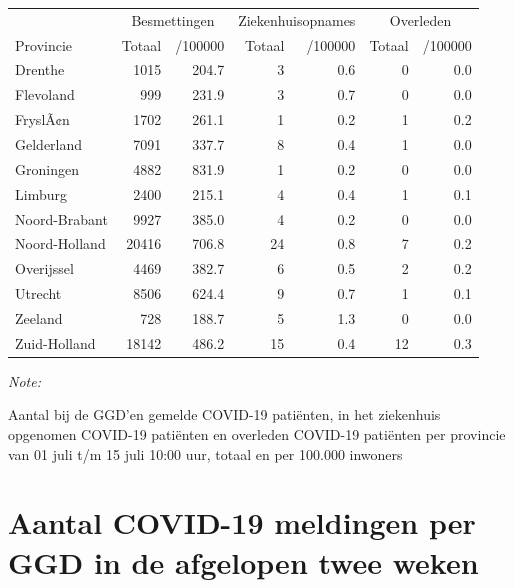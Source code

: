 \documentclass[
  english,
  man,floatsintext]{apa6}
\begin{document}
\begin{table}
\centering
\begin{threeparttable}
\begin{tabular}{lrrrrrr}
\toprule
\multicolumn{1}{c}{ } & \multicolumn{2}{c}{Besmettingen} & \multicolumn{2}{c}{Ziekenhuisopnames} & \multicolumn{2}{c}{Overleden} \\
\cmidrule(l{3pt}r{3pt}){2-3} \cmidrule(l{3pt}r{3pt}){4-5} \cmidrule(l{3pt}r{3pt}){6-7}
Provincie & Totaal & /100000 & Totaal & /100000 & Totaal & /100000\\
\midrule
Drenthe & 1015 & 204.7 & 3 & 0.6 & 0 & 0.0\\
Flevoland & 999 & 231.9 & 3 & 0.7 & 0 & 0.0\\
FryslÃ¢n & 1702 & 261.1 & 1 & 0.2 & 1 & 0.2\\
Gelderland & 7091 & 337.7 & 8 & 0.4 & 1 & 0.0\\
Groningen & 4882 & 831.9 & 1 & 0.2 & 0 & 0.0\\
Limburg & 2400 & 215.1 & 4 & 0.4 & 1 & 0.1\\
Noord-Brabant & 9927 & 385.0 & 4 & 0.2 & 0 & 0.0\\
Noord-Holland & 20416 & 706.8 & 24 & 0.8 & 7 & 0.2\\
Overijssel & 4469 & 382.7 & 6 & 0.5 & 2 & 0.2\\
Utrecht & 8506 & 624.4 & 9 & 0.7 & 1 & 0.1\\
Zeeland & 728 & 188.7 & 5 & 1.3 & 0 & 0.0\\
Zuid-Holland & 18142 & 486.2 & 15 & 0.4 & 12 & 0.3\\
\bottomrule
\end{tabular}
\begin{tablenotes}
\item \textit{Note: } 
\item Aantal bij de GGD’en gemelde COVID-19 patiënten, in het ziekenhuis opgenomen COVID-19 patiënten en overleden COVID-19 patiënten per provincie van 01 juli t/m 15 juli 10:00 uur, totaal en per 100.000 inwoners
\end{tablenotes}
\end{threeparttable}
\end{table}

\newpage

\hypertarget{aantal-covid-19-meldingen-per-ggd-in-de-afgelopen-twee-weken}{%
\section{Aantal COVID-19 meldingen per GGD in de afgelopen twee weken}\label{aantal-covid-19-meldingen-per-ggd-in-de-afgelopen-twee-weken}}
\end{document}
